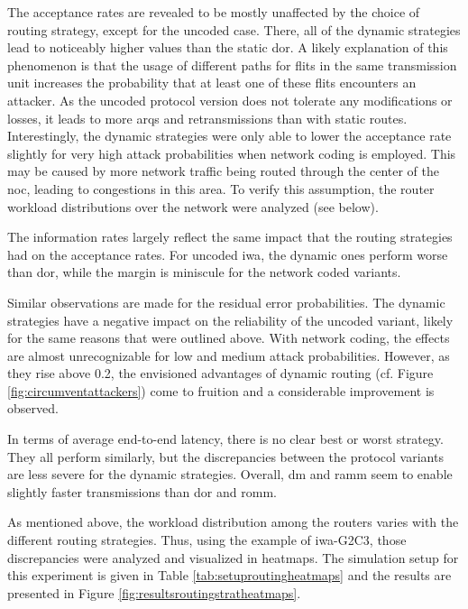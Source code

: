 The acceptance rates are revealed to be mostly unaffected by the choice of routing strategy, except for the uncoded case. There, all of the dynamic
strategies lead to noticeably higher values than the static \gls{dor}. A likely explanation of this phenomenon is that the usage of different paths
for flits in the same transmission unit increases the probability that at least one of these flits encounters an attacker. As the uncoded protocol
version does not tolerate any modifications or losses, it leads to more \glspl{arq} and retransmissions than with static routes. Interestingly, the
dynamic strategies were only able to lower the acceptance rate slightly for very high attack probabilities when network coding is employed. This may
be caused by more network traffic being routed through the center of the \gls{noc}, leading to congestions in this area. To verify this assumption,
the router workload distributions over the network were analyzed (see below).

The information rates largely reflect the same impact that the routing strategies had on the acceptance rates. For uncoded \gls{iwa}, the dynamic ones
perform worse than \gls{dor}, while the margin is miniscule for the network coded variants.

Similar observations are made for the residual error probabilities. The dynamic strategies have a negative impact on the reliability of the uncoded
variant, likely for the same reasons that were outlined above. With network coding, the effects are almost unrecognizable for low and medium attack
probabilities. However, as they rise above 0.2, the envisioned advantages of dynamic routing (cf. Figure \ref{fig:circumventattackers}) come to
fruition and a considerable improvement is observed.

In terms of average end-to-end latency, there is no clear best or worst strategy. They all perform similarly, but the discrepancies between the
protocol variants are less severe for the dynamic strategies. Overall, \gls{dm} and \gls{ramm} seem to enable slightly faster transmissions than
\gls{dor} and \gls{romm}.
\pagebreak

As mentioned above, the workload distribution among the routers varies with the different routing strategies. Thus, using the example of
\gls{iwa}-G2C3, those discrepancies were analyzed and visualized in heatmaps. The simulation setup for this experiment is given in Table
\vref{tab:setuproutingheatmaps} and the results are presented in Figure \vref{fig:resultsroutingstratheatmaps}.

